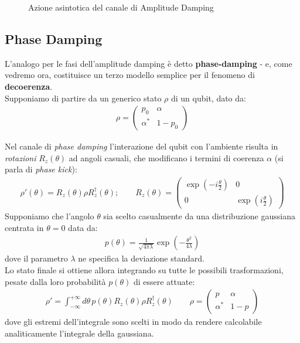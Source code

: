 \documentclass[../../InformazioneQuantistica.tex]{subfiles}
\begin{document}
\begin{figure}
    \centering
    
    \caption{Azione asintotica del canale di Amplitude Damping}
    \label{fig:amplitude-damp-asintoto}
\end{figure}

\subsection{Phase Damping}
L'analogo per le fasi dell'amplitude damping è detto \textbf{phase-damping} - e, come vedremo ora, costituisce un terzo modello semplice per il fenomeno di \textbf{decoerenza}.\\

Supponiamo di partire da un generico stato $\rho$ di un qubit, dato da:
\begin{align*}
    \rho = \begin{pmatrix}
    p_0 & \alpha\\
    \alpha^* & 1-p_0
    \end{pmatrix}
\end{align*}

Nel canale di \textit{phase damping} l'interazione del qubit con l'ambiente risulta in \textit{rotazioni} $R_z(\theta)$ ad angoli casuali, che modificano i termini di coerenza $\alpha$ (si parla di \textit{phase kick}):
\begin{align*}
    \rho'(\theta) = R_z(\theta)\rho R_z^\dag(\theta); \qquad 
    R_z(\theta) = \begin{pmatrix}
    \exp\left(-i\frac{\theta}{2}\right) & 0 \\
    0 & \exp\left(i \frac{\theta}{2}\right)
    \end{pmatrix}
\end{align*}
Supponiamo che l'angolo $\theta$ sia scelto casualmente da una distribuzione gaussiana centrata in $\theta=0$ data da:
\begin{align*}
    p(\theta) = \frac{1}{\sqrt{4\pi \lambda}} \exp\left(-\frac{\theta^2}{4\lambda}\right)
\end{align*}
dove il parametro $\lambda$ ne specifica la deviazione standard.\\


Lo stato finale si ottiene allora integrando su tutte le possibili trasformazioni, pesate dalla loro probabilità $p(\theta)$ di essere attuate:
\begin{align*}
\rho' = \int_{-\infty}^{+\infty} d\theta \, p(\theta) R_z(\theta) \rho R_z^\dag(\theta) \qquad \rho=\begin{pmatrix}
p & \alpha\\
\alpha^* & 1-p
\end{pmatrix}
\end{align*}
dove gli estremi dell'integrale sono scelti in modo da rendere calcolabile analiticamente l'integrale della gaussiana.\\
\end{document}
